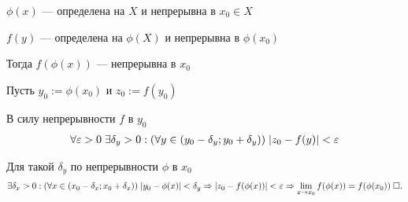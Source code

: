 \documentclass{article}
\begin{document}

\theorem

$\phi(x)$ --- определена на $X$ и непрерывна в $x_0\in X$

$f(y)$ --- определена на $\phi(X)$ и непрерывна в $\phi(x_0)$

Тогда $f(\phi(x))$ --- непрерывна в $x_0$

\proof

Пусть $y_0:=\phi(x_0)$ и $z_0:=f(y_0)$

В силу непрерывности $f$ в $y_0$
\begin{align*}
	\forall\varepsilon>0\;\exists\delta_{y}>0:(\forall y\in(y_0-\delta_{y};y_0+\delta_{y}))\;|z_0-f(y)|< \varepsilon
\end{align*}

Для такой $\delta_{y}$ по непрерывности $\phi$ в $x_0$
\begin{align*}
	\exists\delta_{x}>0:(\forall x\in(x_0-\delta_{x};x_0+\delta_{x}))\;|y_0-\phi(x)|<\delta_{y}\Rightarrow |z_0-f(\phi(x))|<\varepsilon\Rightarrow\lim\limits_{x\to x_0}f(\phi(x))=f(\phi(x_0))\;\square.
\end{align*}
\end{document}
